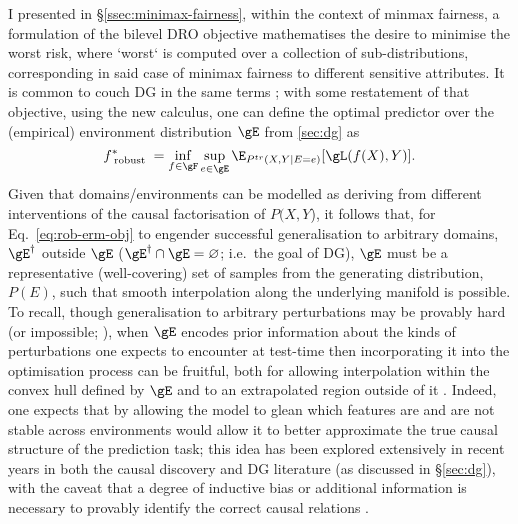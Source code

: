 I presented in \S\ref{ssec:minimax-fairness}, within the context of minmax fairness, a formulation
of the bilevel \ac{DRO} objective mathematises the desire to minimise the worst risk, where `worst`
is computed over a collection of sub-distributions, corresponding in said case of minimax fairness
to different sensitive attributes.
%
%
It is common to couch \ac{DG} in the same terms \citep{arjovsky2019invariant, krueger2021out,
sagawa2019distributionally}; with some restatement of that objective, using the new calculus, one
can define the optimal predictor over the (empirical) environment distribution \(\gE\) from
\ref{sec:dg} as
%
\begin{equation}\label{eq:rob-erm-obj} 
    f^\ast_\text{ robust } =
    \underset{ f \in \gF }{ \mathrm{inf} }\, 
    \underset{ e \in \gE}{ \mathrm{sup} }\,
    \E_{ P^{tr}( X, Y | E = e ) } [ \gL ( f( X ), Y ) ]. 
\end{equation}
%
Given that domains/environments can be modelled as deriving from different interventions of the
causal factorisation of \(P(X, Y\)), it follows that, for Eq.~\ref{eq:rob-erm-obj} to engender
successful generalisation to arbitrary domains, \(\gE^\dagger\) outside \(\gE\) (\( \gE^\dagger
\cap \gE = \varnothing \); i.e.\ the goal of \ac{DG}), \(\gE\) must be a representative
(well-covering) set of samples from the generating distribution, \( P(E) \), such that smooth
interpolation along the underlying manifold is possible.
%
To recall, though generalisation to arbitrary perturbations may be provably hard (or impossible;
\citealp{david2010impossibility}), when \(\gE\) encodes prior information about the kinds of
perturbations one expects to encounter at test-time then incorporating it into the optimisation
process can be fruitful, both for allowing interpolation within the convex hull defined by \(\gE\)
and to an extrapolated region outside of it \citep{krueger2021out}.
%
Indeed, one expects that by allowing the model to glean which features are and are not stable
across environments would allow it to better approximate the true causal structure of the
prediction task;
%
this idea has been explored extensively in recent years in both the causal discovery
\citep{peters2016causal, bengio2019meta} and \ac{DG} \citep{arjovsky2019invariant,
ahuja2020invariant, creager2021environment} literature (as discussed in \S\ref{sec:dg}), with the
caveat that a degree of inductive bias or additional information is necessary to provably identify
the correct causal relations \citep{lin2022zin}.
%

